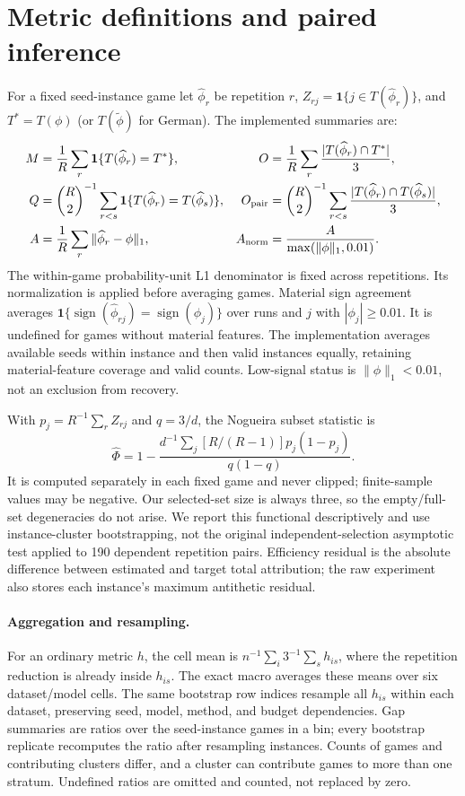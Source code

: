 \documentclass{article}
\newcommand{\ind}{\mathbf{1}}
\begin{document}
\section{Metric definitions and paired inference}
\label{app:metrics}
For a fixed seed-instance game let $\widehat\phi_r$ be repetition $r$, $Z_{rj}=\ind\{j\in T(\widehat\phi_r)\}$, and $T^*=T(\phi)$ (or $T(\widetilde\phi)$ for German). The implemented summaries are:
\begin{align}
 M&=\frac1R\sum_r\ind\{T(\widehat\phi_r)=T^*\}, &
 O&=\frac1R\sum_r\frac{|T(\widehat\phi_r)\cap T^*|}{3},\\
 Q&=\binom R2^{-1}\sum_{r<s}\ind\{T(\widehat\phi_r)=T(\widehat\phi_s)\}, &
 O_{\rm pair}&=\binom R2^{-1}\sum_{r<s}\frac{|T(\widehat\phi_r)\cap T(\widehat\phi_s)|}{3},\\
 A&=\frac1R\sum_r\|\widehat\phi_r-\phi\|_1, &
 A_{\rm norm}&=\frac{A}{\max(\|\phi\|_1,0.01)}.
\end{align}
The within-game probability-unit L1 denominator is fixed across repetitions. Its normalization is applied before averaging games. Material sign agreement averages $\ind\{\operatorname{sign}(\widehat\phi_{rj})=\operatorname{sign}(\phi_j)\}$ over runs and $j$ with $|\phi_j|\geq0.01$. It is undefined for games without material features. The implementation averages available seeds within instance and then valid instances equally, retaining material-feature coverage and valid counts. Low-signal status is $\|\phi\|_1<0.01$, not an exclusion from recovery.

With $p_j=R^{-1}\sum_rZ_{rj}$ and $q=3/d$, the Nogueira subset statistic is
\begin{equation}
 \widehat\Phi=1-\frac{d^{-1}\sum_j[R/(R-1)]p_j(1-p_j)}{q(1-q)}.
\end{equation}
It is computed separately in each fixed game and never clipped; finite-sample values may be negative. Our selected-set size is always three, so the empty/full-set degeneracies do not arise. We report this functional descriptively and use instance-cluster bootstrapping, not the original independent-selection asymptotic test applied to 190 dependent repetition pairs. Efficiency residual is the absolute difference between estimated and target total attribution; the raw experiment also stores each instance's maximum antithetic residual.

\paragraph{Aggregation and resampling.}
For an ordinary metric $h$, the cell mean is $n^{-1}\sum_i3^{-1}\sum_s h_{is}$, where the repetition reduction is already inside $h_{is}$. The exact macro averages these means over six dataset/model cells. The same bootstrap row indices resample all $h_{is}$ within each dataset, preserving seed, model, method, and budget dependencies. Gap summaries are ratios over the seed-instance games in a bin; every bootstrap replicate recomputes the ratio after resampling instances. Counts of games and contributing clusters differ, and a cluster can contribute games to more than one stratum. Undefined ratios are omitted and counted, not replaced by zero.
\end{document}
